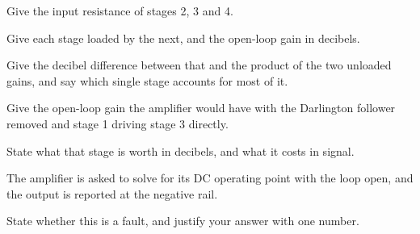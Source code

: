 Give the input resistance of stages 2, 3 and 4.

 Give each stage loaded by the next, and the open-loop gain in decibels.

Give the decibel difference between that and the product of the two unloaded gains, and say which single stage accounts for most of it.

 Give the open-loop gain the amplifier would have with the Darlington follower removed and stage 1 driving stage 3 directly.

State what that stage is worth in decibels, and what it costs in signal.

 The amplifier is asked to solve for its DC operating point with the loop open, and the output is reported at the negative rail.

State whether this is a fault, and justify your answer with one number.
